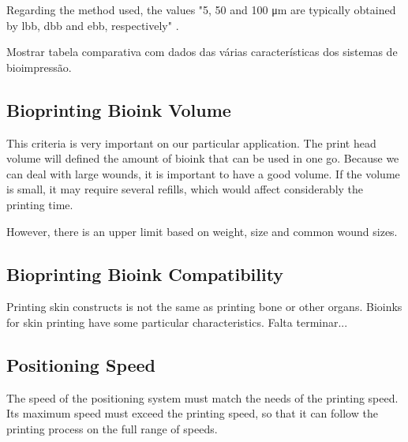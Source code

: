 Regarding the method used, the values "5, 50 and 100 \si{\micro\meter} are typically obtained by \gls{lbb}, \gls{dbb} and \gls{ebb}, respectively" \cite{Datta2018_essential_steps_bioprinting}.

{\color{red} Mostrar tabela comparativa com dados das várias características dos sistemas de bioimpressão.}


\subsection{Bioprinting Bioink Volume}
\label{subsec:system_architecture_requirements_bioprinting_bioink_volume}

This criteria is very important on our particular application. The print head volume will defined the amount of bioink that can be used in one go. Because we can deal with large wounds, it is important to have a good volume. If the volume is small, it may require several refills, which would affect considerably the printing time.

However, there is an upper limit based on weight, size and common wound sizes.


\subsection{Bioprinting Bioink Compatibility}
\label{subsec:system_architecture_requirements_bioprinting_bioink_compatibility}

Printing skin constructs is not the same as printing bone or other organs. Bioinks for skin printing have some particular characteristics. {\color{red}Falta terminar...}


\subsection{Positioning Speed}
\label{subsec:system_architecture_requirements_positioning_speed}

The speed of the positioning system must match the needs of the printing speed. Its maximum speed must exceed the printing speed, so that it can follow the printing process on the full range of speeds.


